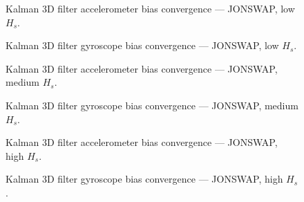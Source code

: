 \documentclass[11pt,letterpaper]{article}
\begin{document}
    \begin{figure}[H]\centering
    \resizebox{\textwidth}{!}{}
    \caption{Kalman 3D filter accelerometer bias convergence — JONSWAP, low $H_s$.}
    \label{fig:w3d_ou2_jonswap_low_acc_bias}
    \end{figure}

    \begin{figure}[H]\centering
    \resizebox{\textwidth}{!}{}
    \caption{Kalman 3D filter gyroscope bias convergence — JONSWAP, low $H_s$.}
    \label{fig:w3d_ou2_jonswap_low_gyro_bias}
    \end{figure}

    \begin{figure}[H]\centering
    \resizebox{\textwidth}{!}{}
    \caption{Kalman 3D filter accelerometer bias convergence — JONSWAP, medium $H_s$.}
    \label{fig:w3d_ou2_jonswap_medium_acc_bias}
    \end{figure}

    \begin{figure}[H]\centering
    \resizebox{\textwidth}{!}{}
    \caption{Kalman 3D filter gyroscope bias convergence — JONSWAP, medium $H_s$.}
    \label{fig:w3d_ou2_jonswap_medium_gyro_bias}
    \end{figure}

    \begin{figure}[H]\centering
    \resizebox{\textwidth}{!}{}
    \caption{Kalman 3D filter accelerometer bias convergence — JONSWAP, high $H_s$.}
    \label{fig:w3d_ou2_jonswap_high_acc_bias}
    \end{figure}

    \begin{figure}[H]\centering
    \resizebox{\textwidth}{!}{}
    \caption{Kalman 3D filter gyroscope bias convergence — JONSWAP, high $H_s$.}
    \label{fig:w3d_ou2_jonswap_high_gyro_bias}
    \end{figure}



\end{document}
